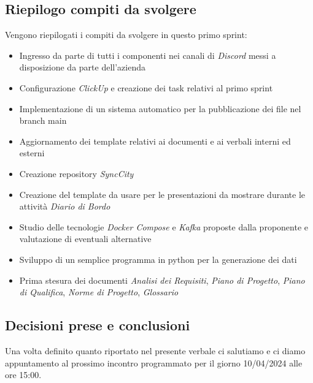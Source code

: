 \documentclass[italian,12pt]{article}
\begin{document}
\subsection{Riepilogo compiti da svolgere}
Vengono riepilogati i compiti da svolgere in questo primo sprint:
\begin{itemize}
	\item Ingresso da parte di tutti i componenti nei canali di \textit{Discord} messi a disposizione da parte dell'azienda
	\item Configurazione \textit{ClickUp} e creazione dei task relativi al primo sprint
	\item Implementazione di un sistema automatico per la pubblicazione dei file nel branch main
	\item Aggiornamento dei template relativi ai documenti e ai verbali interni ed esterni
	\item Creazione repository \textit{SyncCity}
	\item Creazione del template da usare per le presentazioni da mostrare durante le attività \textit{Diario di Bordo}
	\item Studio delle tecnologie \textit{Docker Compose} e \textit{Kafka} proposte dalla proponente e valutazione di eventuali alternative
	\item Sviluppo di un semplice programma in python per la generazione dei dati
	\item Prima stesura dei documenti \textit{Analisi dei Requisiti}, \textit{Piano di Progetto}, \textit{Piano di Qualifica}, \textit{Norme di Progetto}, \textit{Glossario}
\end{itemize}

\subsection{Decisioni prese e conclusioni}
Una volta definito quanto riportato nel presente verbale ci salutiamo e ci diamo appuntamento al prossimo incontro programmato 
per il giorno 10/04/2024 alle ore 15:00.
\end{document}
